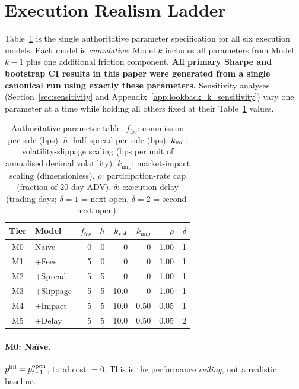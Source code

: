 \documentclass[12pt]{article}
\newcommand{\kimp}{k_{\mathrm{imp}}}
\newcommand{\kfee}{f_{\mathrm{fee}}}
\begin{document}
\section{Execution Realism Ladder}
\label{sec:ladder}

Table~\ref{tab:params} is the single authoritative parameter
specification for all six execution models. Each model is
\emph{cumulative}: Model $k$ includes all parameters from Model $k-1$
plus one additional friction component. \textbf{All primary Sharpe and bootstrap CI results
in this paper were generated from a single canonical run using exactly
these parameters.} Sensitivity analyses (Section~\ref{sec:sensitivity}
and Appendix~\ref{app:lookback_k_sensitivity}) vary one parameter at a
time while holding all others fixed at their Table~\ref{tab:params} values.

\begin{table}[H]
\centering
\caption{Authoritative parameter table. $\kfee$: commission per side
(bps). $h$: half-spread per side (bps). $k_{\rm vol}$: volatility-slippage
scaling (bps per unit of annualised decimal volatility).
$\kimp$: market-impact scaling (dimensionless). $\rho$: participation-rate
cap (fraction of 20-day ADV). $\delta$: execution delay (trading days;
$\delta=1$ = next-open, $\delta=2$ = second-next open).}
\label{tab:params}
\small
\begin{tabular}{clrrrrrr}
\toprule
Tier & Model & $\kfee$ & $h$ & $k_{\rm vol}$ & $\kimp$ & $\rho$ & $\delta$ \\
\midrule
M0 & Na\"{i}ve   & 0 & 0 & 0    & 0    & 1.00 & 1 \\
M1 & +Fees       & 5 & 0 & 0    & 0    & 1.00 & 1 \\
M2 & +Spread     & 5 & 5 & 0    & 0    & 1.00 & 1 \\
M3 & +Slippage   & 5 & 5 & 10.0 & 0    & 1.00 & 1 \\
M4 & +Impact     & 5 & 5 & 10.0 & 0.50 & 0.05 & 1 \\
M5 & +Delay      & 5 & 5 & 10.0 & 0.50 & 0.05 & 2 \\
\bottomrule
\end{tabular}
\end{table}

\paragraph{M0: Na\"{i}ve.}
$p^{\rm fill} = p^{\rm open}_{t+1}$, total cost $= 0$. This is the
performance \emph{ceiling}, not a realistic baseline.
\end{document}
